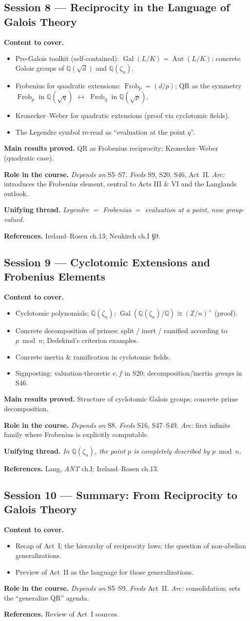 \documentclass[11pt,a4paper]{article}
\newcommand{\sess}[2]{\subsection[#1. #2]{Session #1 --- #2}}
\newcommand{\chead}{\par\smallskip\noindent\textbf{Content to cover.}}
\newcommand{\proved}[1]{\par\smallskip\noindent\textbf{Main results proved.} #1}
\newcommand{\role}[1]{\par\smallskip\noindent\textbf{Role in the course.} #1}
\newcommand{\thread}[1]{\par\smallskip\noindent\textbf{Unifying thread.} \textit{#1}}
\newcommand{\srefs}[1]{\par\smallskip\noindent\textbf{References.} #1}
\newcommand{\Z}{\mathbb{Z}}
\newcommand{\Q}{\mathbb{Q}}
\newcommand{\Gal}{\operatorname{Gal}}
\newcommand{\Aut}{\operatorname{Aut}}
\newcommand{\Frob}{\operatorname{Frob}}
\begin{document}
	\sess{8}{Reciprocity in the Language of Galois Theory}
	\chead
	\begin{itemize}
		\item Pre-Galois toolkit (self-contained): $\Gal(L/K)=\Aut(L/K)$; concrete Galois groups of $\Q(\sqrt d)$ and $\Q(\zeta_n)$.
		\item Frobenius for quadratic extensions: $\Frob_p=(d/p)$; QR as the symmetry $\Frob_p$ in $\Q(\sqrt q)$ $\leftrightarrow$ $\Frob_q$ in $\Q(\sqrt p)$.
		\item Kronecker--Weber for quadratic extensions (proof via cyclotomic fields).
		\item The Legendre symbol re-read as ``evaluation at the point $q$''.
	\end{itemize}
	\proved{QR as Frobenius reciprocity; Kronecker--Weber (quadratic case).}
	\role{\emph{Depends on} S5--S7. \emph{Feeds} S9, S20, S46, Act~II. \emph{Arc:} introduces the Frobenius element, central to Acts III \& VI and the Langlands outlook.}
	\thread{Legendre $=$ Frobenius $=$ evaluation at a point, now group-valued.}
	\srefs{Ireland--Rosen ch.13; Neukirch ch.I \S9.}
	
	\sess{9}{Cyclotomic Extensions and Frobenius Elements}
	\chead
	\begin{itemize}
		\item Cyclotomic polynomials; $\Q(\zeta_n)$; $\Gal(\Q(\zeta_n)/\Q)\cong(\Z/n)^\times$ (proof).
		\item Concrete decomposition of primes: split / inert / ramified according to $p\bmod n$; Dedekind's criterion examples.
		\item Concrete inertia \& ramification in cyclotomic fields.
		\item Signposting: valuation-theoretic $e,f$ in S20; decomposition/inertia \emph{groups} in S46.
	\end{itemize}
	\proved{Structure of cyclotomic Galois groups; concrete prime decomposition.}
	\role{\emph{Depends on} S8. \emph{Feeds} S16, S47--S49. \emph{Arc:} first infinite family where Frobenius is explicitly computable.}
	\thread{In $\Q(\zeta_n)$, the point $p$ is completely described by $p\bmod n$.}
	\srefs{Lang, \emph{ANT} ch.I; Ireland--Rosen ch.13.}
	
	\sess{10}{Summary: From Reciprocity to Galois Theory}
	\chead
	\begin{itemize}
		\item Recap of Act~I; the hierarchy of reciprocity laws; the question of non-abelian generalizations.
		\item Preview of Act~II as the language for those generalizations.
	\end{itemize}
	\role{\emph{Depends on} S5--S9. \emph{Feeds} Act~II. \emph{Arc:} consolidation; sets the ``generalize QR'' agenda.}
	\srefs{Review of Act~I sources.}
	
\end{document}
